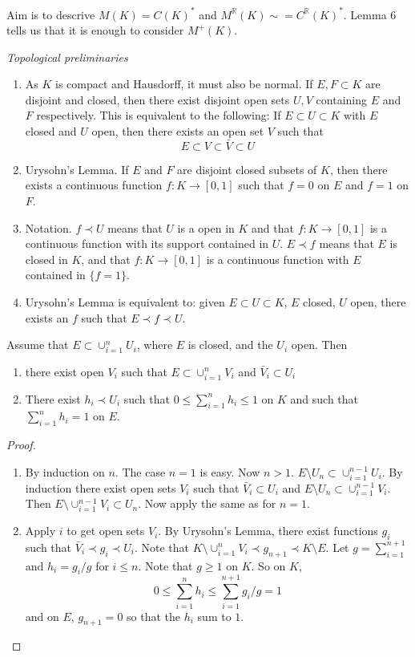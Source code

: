 Aim is to descrive $M(K)=C(K)^*$
and $M^\mathbb{R}(K)\sim = C^\mathbb{R}(K)^*$.
Lemma 6 tells us that it is enough to consider
$M^+(K)$.

\emph{Topological preliminaries}

\begin{enumerate}
  \item As $K$ is compact and Hausdorff, it must also be normal. If $E,F\subset K$
  are disjoint and closed, then there exist
  disjoint open sets $U,V$ containing $E$ and $F$ respectively.
  This is equivalent to the following:
  If $E\subset U\subset K$ with $E$ closed and $U$ open,
  then there exists an open set $V$ such that
  $$E\subset V\subset \bar V\subset U$$
  \item
  Urysohn's Lemma.
  If $E$ and $F$ are disjoint closed subsets of $K$,
  then there exists a continuous function $f:K\to [0,1]$
  such that $f=0$ on $E$ and $f=1$ on $F$.
  \item Notation. $f\prec U$ means that $U$ is a open in $K$ and that $f:K\to[0,1]$
  is a continuous function with its support contained in $U$.
  $E\prec f$ means that $E$ is closed in $K$,
  and that $f:K\to[0,1]$
  is a continuous function with $E$ contained in $\{f=1\}$.
  \item Urysohn's Lemma is equivalent to:
  given $E\subset U\subset K$, $E$ closed, $U$ open,
  there exists an $f$ such that
  $E\prec f\prec U$.
\end{enumerate}

\begin{lemma}
  Assume that $E\subset \cup_{i=1}^n U_i$,
  where $E$ is closed, and the $U_i$ open. Then
  \begin{enumerate}
    \item there exist open $V_i$ such that $E\subset \cup_{i=1}^{n} V_i$
  and $\bar V_i \subset U_i$
  \item There exist $h_i\prec U_i$ such that $0\leq \sum_{i=1}^n h_i\leq 1$
  on $K$ and such that $\sum_{i=1}^n h_i=1$ on $E$.
  \end{enumerate}
\end{lemma}

\begin{proof}
  \begin{enumerate}
    \item By induction on $n$.
    The case $n=1$ is easy.
    Now $n>1$. $E\setminus U_n\subset \cup_{i=1}^{n-1} U_i$. By induction there exist open sets $V_i$
    such that $\bar V_i\subset U_i$ and $E\setminus U_n\subset \cup_{i=1}^{n-1}V_i$.
    Then $E\setminus\cup_{i=1}^{n-1}V_i\subset U_n $.
    Now apply the same as for $n=1$.
    \item Apply $i$ to get open sets $V_i$.
    By Urysohn's Lemma, there exist functions $g_i$ such that
    $\bar V_i \prec g_i\prec U_i$.
    Note that
    $K\setminus \cup_{i=1}^n V_i \prec g_{n+1}\prec K\setminus E$.
    Let $g=\sum_{i=1}^{n+1}$
    and $h_i=g_i/g$ for $i\leq n$. Note that $g\geq 1$ on $K$.
    So on $K$, $$0\leq \sum_{i=1}^n h_i\leq \sum_{i=1}^{n+1}g_i/g=1$$
    and on $E$,
    $g_{n+1}=0$ so that the $h_i$ sum to $1$.
  \end{enumerate}
\end{proof}


